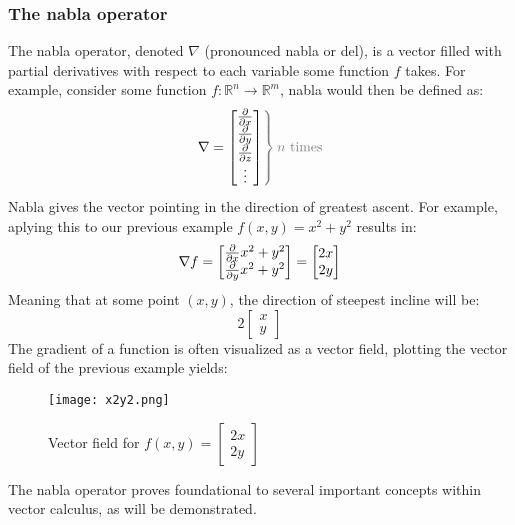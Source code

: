 \subsubsection*{The nabla operator}
The nabla operator, denoted $\nabla$ (pronounced nabla or del), is a vector filled with partial derivatives with respect to each variable some function $f$ takes. For example, consider some function $f:\mathbb{R}^n\rightarrow\mathbb{R}^m$, nabla would then be defined as:
\begin{equation}
	\left.\nabla=
	\begin{bmatrix}
		\partialder{}{x} \\
		\partialder{}{y} \\
		\partialder{}{z} \\ 
		\vdots 	         \\
	\end{bmatrix}
	\color{gray}\right\} \color{gray}n\text{ times}\color{black}
\end{equation}
Nabla gives the vector pointing in the direction of greatest ascent. For example, aplying this to our previous example $f(x,y)=x^2+y^2$ results in:
$$\nabla f=\begin{bmatrix}
	\frac{\partial }{\partial x}x^2+y^2\\
	\frac{\partial }{\partial y}x^2+y^2	
\end{bmatrix}=\begin{bmatrix}
	2x\\
	2y
\end{bmatrix}$$
Meaning that at some point $(x,y)$, the direction of steepest incline will be:$$2{\begin{bmatrix}x\\y\end{bmatrix}}$$
The gradient of a function is often visualized as a vector field, plotting the vector field of the previous example yields:

\begin{figure}[!ht]
	\texttt{[image: x2y2.png]}
	\centering
	\caption{Vector field for $f(x,y)=\begin{bmatrix}2x\\2y\end{bmatrix}$}
	\label{fig:x2y2}
\end{figure}

The nabla operator proves foundational to several important concepts within vector calculus, as will be demonstrated.

